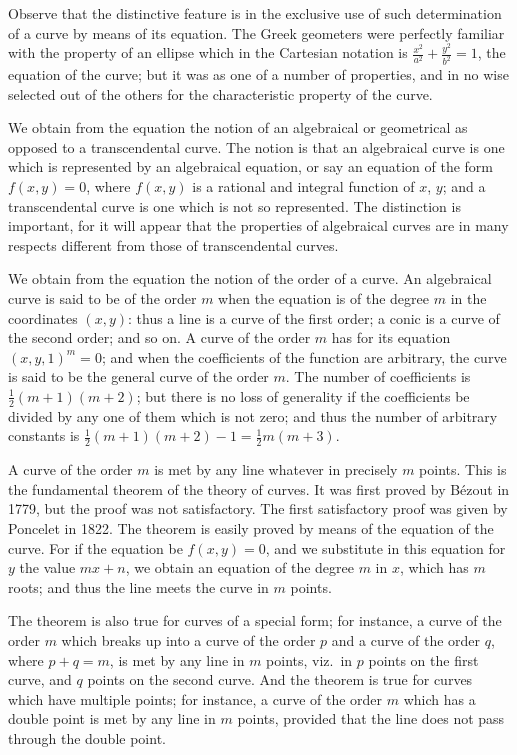 \documentclass[11pt,a4paper]{article}
\begin{document}
Observe that the distinctive feature is in the exclusive use of such
determination of a curve by means of its equation. The Greek geometers
were perfectly familiar with the property of an ellipse which in the
Cartesian notation is $\frac{x^2}{a^2} + \frac{y^2}{b^2} = 1$, the
equation of the curve; but it was as one of a number of properties, and
in no wise selected out of the others for the characteristic property of
the curve.

We obtain from the equation the notion of an algebraical or geometrical
as opposed to a transcendental curve. The notion is that an
algebraical curve is one which is represented by an algebraical
equation, or say an equation of the form $f(x, y) = 0$, where $f(x, y)$
is a rational and integral function of $x$, $y$; and a transcendental
curve is one which is not so represented. The distinction is
important, for it will appear that the properties of algebraical curves
are in many respects different from those of transcendental curves.

We obtain from the equation the notion of the order of a curve. An
algebraical curve is said to be of the order $m$ when the equation is
of the degree $m$ in the coordinates $(x, y)$: thus a line is a curve
of the first order; a conic is a curve of the second order; and so on.
A curve of the order $m$ has for its equation $(x, y, 1)^m = 0$; and
when the coefficients of the function are arbitrary, the curve is said
to be the general curve of the order $m$. The number of coefficients
is $\frac{1}{2}(m+1)(m+2)$; but there is no loss of generality if the
coefficients be divided by any one of them which is not zero; and thus
the number of arbitrary constants is $\frac{1}{2}(m+1)(m+2) - 1 =
\frac{1}{2}m(m+3)$.

A curve of the order $m$ is met by any line whatever in precisely $m$
points. This is the fundamental theorem of the theory of curves. It
was first proved by B\'{e}zout in 1779, but the proof was not
satisfactory. The first satisfactory proof was given by Poncelet in
1822. The theorem is easily proved by means of the equation of the
curve. For if the equation be $f(x, y) = 0$, and we substitute in
this equation for $y$ the value $mx + n$, we obtain an equation of the
degree $m$ in $x$, which has $m$ roots; and thus the line meets the
curve in $m$ points.

The theorem is also true for curves of a special form; for instance, a
curve of the order $m$ which breaks up into a curve of the order $p$
and a curve of the order $q$, where $p+q=m$, is met by any line in $m$
points, viz.\ in $p$ points on the first curve, and $q$ points on the
second curve. And the theorem is true for curves which have multiple
points; for instance, a curve of the order $m$ which has a double point
is met by any line in $m$ points, provided that the line does not pass
through the double point.
\end{document}
